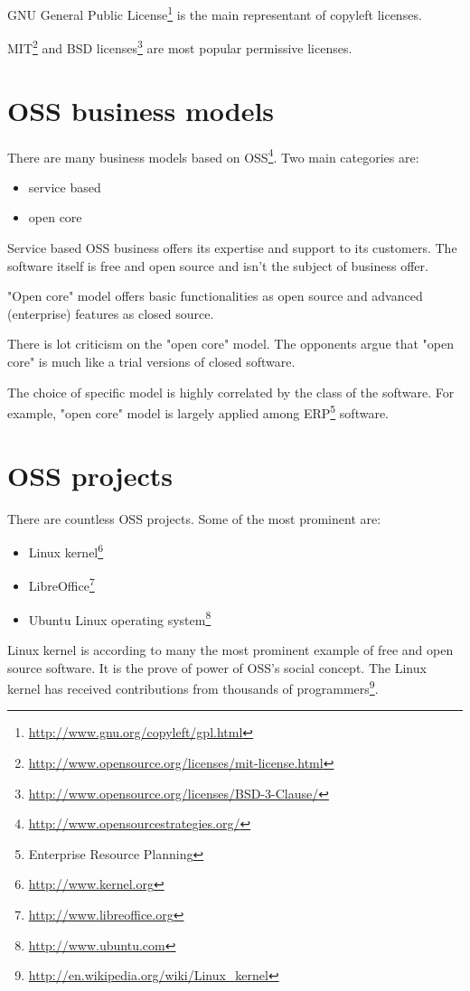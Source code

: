 \documentclass[times, utf8, seminar]{fit}
\begin{document}
GNU General Public License\footnote{\url{http://www.gnu.org/copyleft/gpl.html}} is the main representant of copyleft licenses.

MIT\footnote{\url{http://www.opensource.org/licenses/mit-license.html}} and BSD licenses\footnote{\url{http://www.opensource.org/licenses/BSD-3-Clause/}} are most popular permissive licenses.

\section{OSS business models}

There are many business models based on OSS\footnote{\url{http://www.opensourcestrategies.org/}}. Two main categories are: 
\begin{itemize}
  \item service based
  \item open core
\end{itemize}

Service based OSS business offers its expertise and support to its customers. The software itself is free and open source and isn't the subject of business offer.

"Open core" model offers basic functionalities as open source and advanced (enterprise) features as closed source.

There is lot criticism on the "open core" model. The opponents argue that "open core" is much like a trial versions of closed software.

The choice of specific model is highly correlated by the class of the software.  For example, "open core" model is largely applied among ERP\footnote{Enterprise Resource Planning} software.  

\section{OSS projects}

There are countless OSS projects. Some of the most prominent are:  
\begin{itemize}
  \item Linux kernel\footnote{\url{http://www.kernel.org}}
  \item LibreOffice\footnote{\url{http://www.libreoffice.org}}
  \item Ubuntu Linux operating system\footnote{\url{http://www.ubuntu.com}}
\end{itemize}

Linux kernel is according to many the most prominent example of free and open source software. It is the prove of power of OSS's social concept. The Linux kernel has received contributions from thousands of programmers\footnote{\url{http://en.wikipedia.org/wiki/Linux_kernel}}.
\end{document}
